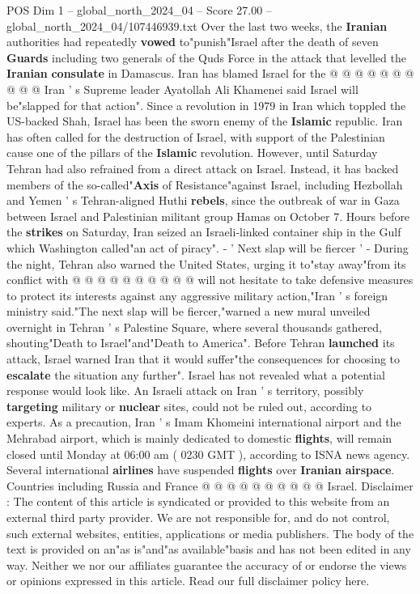 \begin{textsample}{POS Dim 1 – global\_north\_2024\_04 – Score 27.00 – global\_north\_2024\_04/107446939.txt}
Over the last two weeks, the \textbf{Iranian} authorities had repeatedly \textbf{vowed} to"punish"Israel after the death of seven \textbf{Guards} including two generals of the Quds Force in the attack that levelled the \textbf{Iranian} \textbf{consulate} in Damascus.
Iran has blamed Israel for the @ @ @ @ @ @ @ @ @ @ Iran ' s Supreme leader Ayatollah Ali Khamenei said Israel will be"slapped for that action".
Since a revolution in 1979 in Iran which toppled the US-backed Shah, Israel has been the sworn enemy of the \textbf{Islamic} republic.
Iran has often called for the destruction of Israel, with support of the Palestinian cause one of the pillars of the \textbf{Islamic} revolution.
However, until Saturday Tehran had also refrained from a direct attack on Israel.
Instead, it has backed members of the so-called"\textbf{Axis} of Resistance"against Israel, including Hezbollah and Yemen ' s Tehran-aligned Huthi \textbf{rebels}, since the outbreak of war in Gaza between Israel and Palestinian militant group Hamas on October 7.
Hours before the \textbf{strikes} on Saturday, Iran seized an Israeli-linked container ship in the Gulf which Washington called"an act of piracy". - ' Next slap will be fiercer ' - During the night, Tehran also warned the United States, urging it to"stay away"from its conflict with @ @ @ @ @ @ @ @ @ @ will not hesitate to take defensive measures to protect its interests against any aggressive military action,"Iran ' s foreign ministry said."The next slap will be fiercer,"warned a new mural unveiled overnight in Tehran ' s Palestine Square, where several thousands gathered, shouting"Death to Israel"and"Death to America".
Before Tehran \textbf{launched} its attack, Israel warned Iran that it would suffer"the consequences for choosing to \textbf{escalate} the situation any further".
Israel has not revealed what a potential response would look like.
An Israeli attack on Iran ' s territory, possibly \textbf{targeting} military or \textbf{nuclear} sites, could not be ruled out, according to experts.
As a precaution, Iran ' s Imam Khomeini international airport and the Mehrabad airport, which is mainly dedicated to domestic \textbf{flights}, will remain closed until Monday at 06:00 am ( 0230 GMT ), according to ISNA news agency.
Several international \textbf{airlines} have suspended \textbf{flights} over \textbf{Iranian} \textbf{airspace}.
Countries including Russia and France @ @ @ @ @ @ @ @ @ @ Israel.
Disclaimer : The content of this article is syndicated or provided to this website from an external third party provider.
We are not responsible for, and do not control, such external websites, entities, applications or media publishers.
The body of the text is provided on an"as is"and"as available"basis and has not been edited in any way.
Neither we nor our affiliates guarantee the accuracy of or endorse the views or opinions expressed in this article.
Read our full disclaimer policy here.

\end{textsample}

